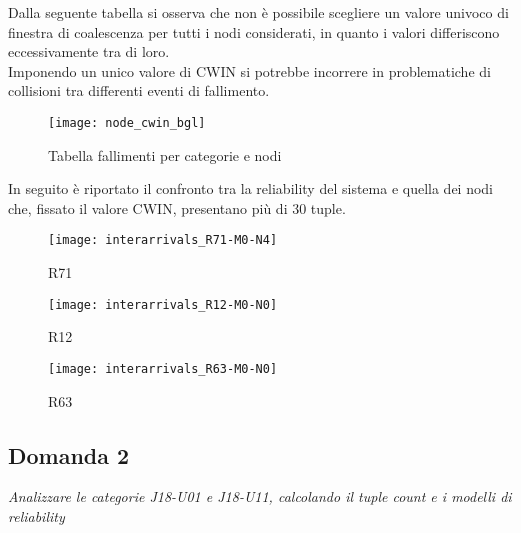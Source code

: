 \clearpage

Dalla seguente tabella si osserva che non è possibile scegliere un
valore univoco di finestra di coalescenza per tutti i nodi considerati, in quanto
i valori differiscono eccessivamente tra di loro.\\
Imponendo un unico valore di CWIN si potrebbe incorrere in problematiche di
collisioni tra differenti eventi di fallimento.\\

\begin{figure}[!htbp]
  \centering
  \texttt{[image: node\_cwin\_bgl]}
  \caption{Tabella fallimenti per categorie e nodi}
  \label{ffda_node_cwin_bgl}
\end{figure}

\clearpage

In seguito è riportato il confronto tra la reliability del sistema e quella dei
nodi che, fissato il valore CWIN, presentano più di 30 tuple.\\

\begin{minipage}{\linewidth}
  \centering
  \begin{minipage}{.49\linewidth}
    \begin{figure}[H]
      \texttt{[image: interarrivals\_R71-M0-N4]}
      \caption*{R71}
    \end{figure}
  \end{minipage}
  \begin{minipage}{.49\linewidth}
    \begin{figure}[H]
      \texttt{[image: interarrivals\_R12-M0-N0]}
      \caption*{R12}
    \end{figure}
  \end{minipage}
  \begin{minipage}{.49\linewidth}
    \hspace{0.25\linewidth}
    \begin{figure}[H]
      \texttt{[image: interarrivals\_R63-M0-N0]}
      \caption*{R63}
    \end{figure}
  \end{minipage}
\end{minipage}

\clearpage

\subsection{Domanda 2}
\textit{Analizzare le categorie J18-U01 e J18-U11, calcolando il tuple count e
i modelli di reliability}

